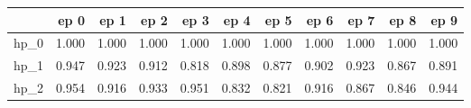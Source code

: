 \begin{tabular}{lrrrrrrrrrr}
\toprule
{} &   ep 0 &   ep 1 &   ep 2 &   ep 3 &   ep 4 &   ep 5 &   ep 6 &   ep 7 &   ep 8 &   ep 9 \\
\midrule
hp\_0 &  1.000 &  1.000 &  1.000 &  1.000 &  1.000 &  1.000 &  1.000 &  1.000 &  1.000 &  1.000 \\
hp\_1 &  0.947 &  0.923 &  0.912 &  0.818 &  0.898 &  0.877 &  0.902 &  0.923 &  0.867 &  0.891 \\
hp\_2 &  0.954 &  0.916 &  0.933 &  0.951 &  0.832 &  0.821 &  0.916 &  0.867 &  0.846 &  0.944 \\
\bottomrule
\end{tabular}
